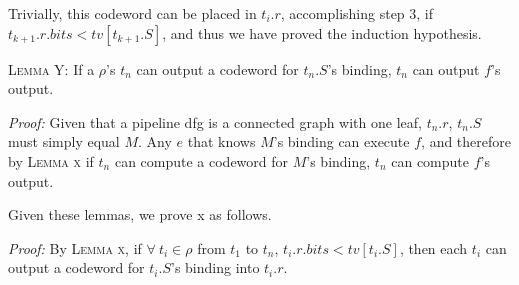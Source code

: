 Trivially, this codeword can be placed in $t_i.r$, accomplishing step 3, if $t_{k+1}.r.bits < tv[t_{k+1}.S]$, and thus we have proved the induction hypothesis.
\vspace{2mm}

\noindent \textsc{Lemma Y:} If a $\rho$'s $t_n$ can output a codeword for $t_n.S$'s binding, $t_n$ can output $f$'s output.
\vspace{2mm}

\noindent \textit{Proof:} Given that a pipeline dfg is a connected graph with one leaf, $t_n.r$, $t_n.S$ must simply equal $M$. Any $e$ that knows $M$'s binding can execute $f$, and therefore by \textsc{Lemma x} if $t_n$ can compute a codeword for $M$'s binding, $t_n$ can compute $f$'s output.
\vspace{2mm}

\noindent Given these lemmas, we prove x as follows.
\vspace{2mm}

\noindent \textit{Proof:} By \textsc{Lemma x}, if $\forall\ t_i \in \rho$ from $t_1$ to $t_n$, $t_i.r.bits < tv[t_i.S]$, then each $t_i$ can output a codeword for $t_i.S$'s binding into $t_i.r$.





